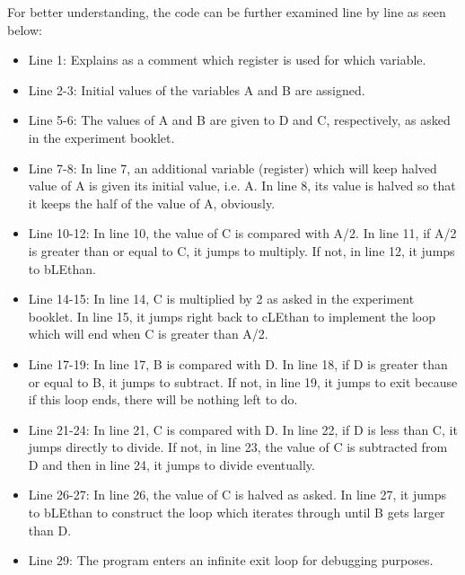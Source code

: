 \documentclass[pdftex,12pt,a4paper]{article}
\begin{document}
 For better understanding, the code can be further examined line by line as seen below:
\begin{itemize}
    \item Line 1: Explains as a comment which register is used for which variable.
    \item Line 2-3: Initial values of the variables A and B are assigned.
    \item Line 5-6: The values of A and B are given to D and C, respectively, as asked in the experiment booklet.
    \item Line 7-8: In line 7, an additional variable (register) which will keep halved value of A is given its initial value, i.e. A. In line 8, its value is halved so that it keeps the half of the value of A, obviously.
    \item Line 10-12: In line 10, the value of C is compared with A/2. In line 11, if A/2 is greater than or equal to C, it jumps to multiply. If not, in line 12, it jumps to bLEthan.
    \item Line 14-15: In line 14, C is multiplied by 2 as asked in the experiment booklet. In line 15, it jumps right back to cLEthan to implement the loop which will end when C is greater than A/2.
    \item Line 17-19: In line 17, B is compared with D. In line 18, if D is greater than or equal to B, it jumps to subtract. If not, in line 19, it jumps to exit because if this loop ends, there will be nothing left to do.
    \item Line 21-24: In line 21, C is compared with D. In line 22, if D is less than C, it jumps directly to divide. If not, in line 23, the value of C is subtracted from D and then in line 24, it jumps to divide eventually.
    \item Line 26-27: In line 26, the value of C is halved as asked. In line 27, it jumps to bLEthan to construct the loop which iterates through until B gets larger than D.
    \item Line 29: The program enters an infinite exit loop for debugging purposes.
\end{itemize}
\end{document}

